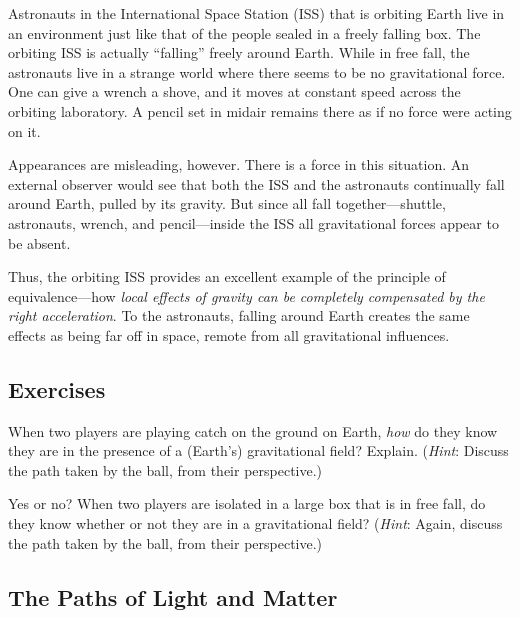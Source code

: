 \documentclass{article}
\numberwithin{equation}{section}
\numberwithin{figure}{section}
\begin{document}
Astronauts in the International Space Station (ISS) that is orbiting Earth live in an environment just like that of the people sealed in a freely falling box. The orbiting ISS is actually ``falling'' freely around Earth. While in free fall, the astronauts live in a strange world where there seems to be no gravitational force. One can give a wrench a shove, and it moves at constant speed across the orbiting laboratory. A pencil set in midair remains there as if no force were acting on it.
\vspace{1em}

Appearances are misleading, however. There is a force in this situation. An external observer would see that both the ISS and the astronauts continually fall around Earth, pulled by its gravity. But since all fall together---shuttle, astronauts, wrench, and pencil---inside the ISS all gravitational forces appear to be absent.
\vspace{1em}

Thus, the orbiting ISS provides an excellent example of the principle of equivalence---how \textit{local effects of gravity can be completely compensated by the right acceleration}. To the astronauts, falling around Earth creates the same effects as being far off in space, remote from all gravitational influences.

\cyanhrule

\subsection*{Exercises}

\begin{exercise} \label{MiCFJv}
    When two players are playing catch on the ground on Earth, \textit{how} do they know they are in the presence of a (Earth's) gravitational field? Explain. (\textit{Hint}: Discuss the path taken by the ball, from their perspective.)
\end{exercise}

\begin{exercise} \label{6n6goF}
    Yes or no? When two players are isolated in a large box that is in free fall, do they know whether or not they are in a gravitational field? (\textit{Hint}: Again, discuss the path taken by the ball, from their perspective.)
\end{exercise}

\clearpage
\subsection*{The Paths of Light and Matter}
\end{document}
